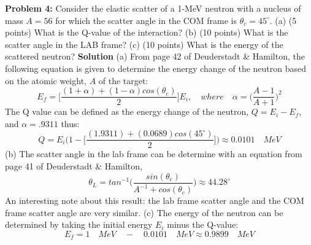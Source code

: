 \documentclass{amsart}
\theoremstyle{definition}
\begin{document}
 
\newpage 
\textbf{Problem 4:} Consider the elastic scatter of a 1-MeV neutron with a nucleus of mass $ A=56$ for which the scatter angle in the COM frame is $\theta_c = 45^\circ$. \newline
(a) (5 points) What is the Q-value of the interaction? \newline
(b) (10 points) What is the scatter angle in the LAB frame? \newline
(c) (10 points) What is the energy of the scattered neutron? \newline
\textbf{Solution}
(a) From page 42 of Deuderstadt \& Hamilton, the following equation is given to determine the energy change of the neutron based on the atomic weight, $A$ of the target:
\bigbreak
\begin{equation*}
   E_f = \bigg[\frac{(1+\alpha)+(1-\alpha)cos(\theta_c)}{2}\bigg]E_i, \quad where \quad \alpha=\bigg(\frac{A-1}{A+1}\bigg)^2
\end{equation*}
\bigbreak
The Q value can be defined as the energy change of the neutron, $Q=E_i-E_f$, and $\alpha=.9311$ thus:
\bigbreak
\begin{equation*}
   Q = E_i\bigg(1- \bigg[\frac{(1.9311)+(0.0689)cos(45^\circ)}{2}\bigg]\bigg) \approx \boxed{0.0101 \quad MeV}
\end{equation*}
\bigbreak
(b) The scatter angle in the lab frame can be determine with an equation from page 41 of Deuderstadt \& Hamilton,
\bigbreak
\begin{equation*}
   \theta_L = tan^{-1}\bigg(\frac{sin(\theta_c)}{A^{-1}+cos(\theta_c)}\bigg) \approx \boxed{44.28^\circ}
\end{equation*}
\bigbreak
An interesting note about this result: the lab frame scatter angle and the COM frame scatter angle are very similar.
\bigbreak
(c) The energy of the neutron can be determined by taking the initial energy $E_i$ minus the Q-value:
\begin{equation*}
   E_f = 1 \quad MeV \quad - \quad 0.0101 \quad MeV \approx \boxed{0.9899 \quad MeV}
\end{equation*}
\end{document}
